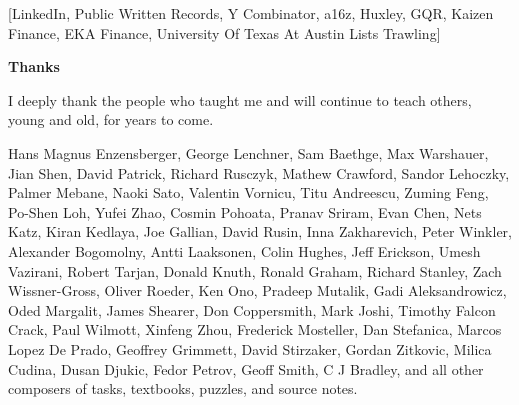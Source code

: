 [LinkedIn, Public Written Records, Y Combinator, a16z, Huxley, GQR, Kaizen Finance, EKA Finance, University Of Texas At Austin Lists Trawling]



\newpage

\textbf{Thanks}

I deeply thank the people who taught me and will continue to teach others, young and old, for years to come.

Hans Magnus Enzensberger, George Lenchner, Sam Baethge, Max Warshauer, Jian Shen, David Patrick, Richard Rusczyk, Mathew Crawford, Sandor Lehoczky, Palmer Mebane, Naoki Sato, Valentin Vornicu, Titu Andreescu, Zuming Feng, Po-Shen Loh, Yufei Zhao, Cosmin Pohoata, Pranav Sriram, Evan Chen, Nets Katz, Kiran Kedlaya, Joe Gallian, David Rusin, Inna Zakharevich, Peter Winkler, Alexander Bogomolny, Antti Laaksonen, Colin Hughes, Jeff Erickson, Umesh Vazirani, Robert Tarjan, Donald Knuth, Ronald Graham, Richard Stanley, Zach Wissner-Gross, Oliver Roeder, Ken Ono, Pradeep Mutalik, Gadi Aleksandrowicz, Oded Margalit, James Shearer, Don Coppersmith, Mark Joshi, Timothy Falcon Crack, Paul Wilmott, Xinfeng Zhou, Frederick Mosteller, Dan Stefanica, Marcos Lopez De Prado, Geoffrey Grimmett, David Stirzaker, Gordan Zitkovic, Milica Cudina, Dusan Djukic, Fedor Petrov, Geoff Smith, C J Bradley, and all other composers of tasks, textbooks, puzzles, and source notes.